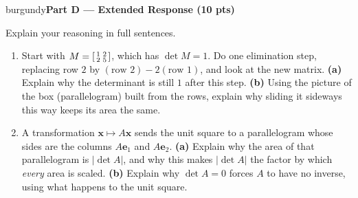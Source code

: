 \documentclass[10pt]{article}
\newcommand{\xx}{\mathbf{x}}
\newcommand{\ee}{\mathbf{e}}
\newcommand{\parthead}[1]{%
  \vspace{6pt}\noindent
  \begin{headlinebox}{burgundy}{\color{white}\bfseries #1}\end{headlinebox}%
  \vspace{4pt}}
\begin{document}
\parthead{Part D --- Extended Response (10 pts)}
Explain your reasoning in full sentences.

\begin{enumerate}[leftmargin=1.9em, itemsep=16pt]
  \item Start with $M=\begin{bsmallmatrix}1&2\\2&5\end{bsmallmatrix}$, which has $\det M=1$. Do one
        elimination step, replacing row $2$ by $(\text{row }2)-2(\text{row }1)$, and look at the new matrix.
        \textbf{(a)} Explain why the determinant is still $1$ after this step. \textbf{(b)} Using the picture
        of the box (parallelogram) built from the rows, explain why sliding it sideways this way keeps its
        area the same.
        \vspace{3.0cm}
  \item A transformation $\xx\mapsto A\xx$ sends the unit square to a parallelogram whose sides are the
        columns $A\ee_1$ and $A\ee_2$. \textbf{(a)} Explain why the area of that parallelogram is $|\det A|$,
        and why this makes $|\det A|$ the factor by which \emph{every} area is scaled. \textbf{(b)} Explain
        why $\det A=0$ forces $A$ to have no inverse, using what happens to the unit square.
        \vspace{2.8cm}
\end{enumerate}
\end{document}
